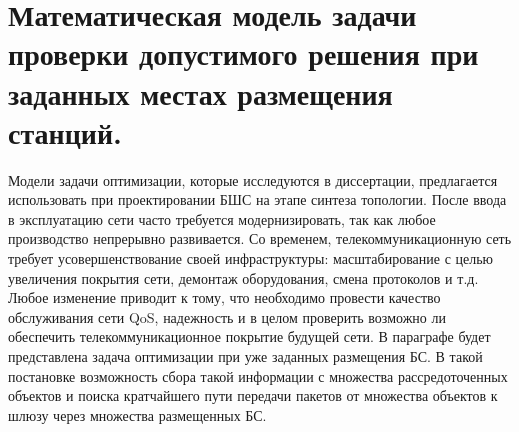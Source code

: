 



\section{Математическая модель задачи проверки допустимого решения  при заданных местах размещения станций.}
Модели задачи оптимизации, которые исследуются в диссертации, предлагается использовать при проектировании БШС на этапе синтеза топологии. После ввода в эксплуатацию сети часто требуется модернизировать, так как любое производство непрерывно развивается. Со временем, телекоммуникационную сеть требует усовершенствование своей инфраструктуры: масштабирование с целью увеличения покрытия сети, демонтаж оборудования, смена протоколов и т.д. Любое изменение приводит к тому, что необходимо провести качество обслуживания сети QoS, надежность и в целом проверить возможно ли обеспечить телекоммуникационное покрытие будущей сети. В параграфе будет представлена задача оптимизации при уже заданных размещения БС. В такой постановке возможность сбора такой информации с множества рассредоточенных объектов и поиска кратчайшего пути передачи пакетов от множества объектов к шлюзу через множества размещенных БС.


